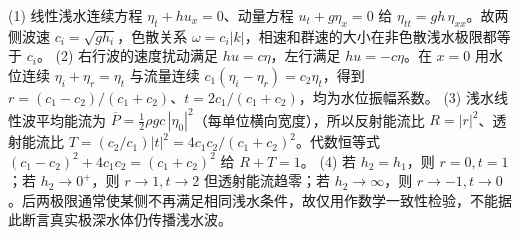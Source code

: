 (1) 线性浅水连续方程 \(\eta_t+h u_x=0\)、动量方程 \(u_t+g\eta_x=0\) 给 \(\eta_{tt}=gh\,\eta_{xx}\)。故两侧波速 \(c_i=\sqrt{gh_i}\)，色散关系 \(\omega=c_i|k|\)，相速和群速的大小在非色散浅水极限都等于 \(c_i\)。
(2) 右行波的速度扰动满足 \(hu=c\eta\)，左行满足 \(hu=-c\eta\)。在 \(x=0\) 用水位连续 \(\eta_i+\eta_r=\eta_t\) 与流量连续 \(c_1(\eta_i-\eta_r)=c_2\eta_t\)，得到 \(r=(c_1-c_2)/(c_1+c_2)\)、\(t=2c_1/(c_1+c_2)\)，均为水位振幅系数。
(3) 浅水线性波平均能流为 \(\overline P=\frac12\rho g c\,|\eta_0|^2\)（每单位横向宽度），所以反射能流比 \(R=|r|^2\)、透射能流比 \(T=(c_2/c_1)|t|^2=4c_1c_2/(c_1+c_2)^2\)。代数恒等式 \((c_1-c_2)^2+4c_1c_2=(c_1+c_2)^2\) 给 \(R+T=1\)。
(4) 若 \(h_2=h_1\)，则 \(r=0,t=1\)；若 \(h_2\to0^+\)，则 \(r\to1,t\to2\) 但透射能流趋零；若 \(h_2\to\infty\)，则 \(r\to-1,t\to0\)。后两极限通常使某侧不再满足相同浅水条件，故仅用作数学一致性检验，不能据此断言真实极深水体仍传播浅水波。
